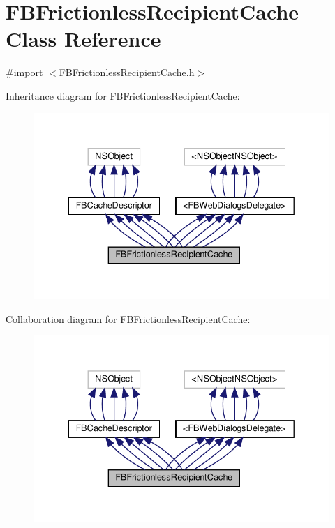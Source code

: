 \hypertarget{interfaceFBFrictionlessRecipientCache}{}\section{F\+B\+Frictionless\+Recipient\+Cache Class Reference}
\label{interfaceFBFrictionlessRecipientCache}


{\ttfamily \#import $<$F\+B\+Frictionless\+Recipient\+Cache.\+h$>$}



Inheritance diagram for F\+B\+Frictionless\+Recipient\+Cache\+:
\nopagebreak
\begin{figure}[H]
\begin{center}
\leavevmode
\includegraphics[width=336pt]{interfaceFBFrictionlessRecipientCache__inherit__graph}
\end{center}
\end{figure}


Collaboration diagram for F\+B\+Frictionless\+Recipient\+Cache\+:
\nopagebreak
\begin{figure}[H]
\begin{center}
\leavevmode
\includegraphics[width=336pt]{interfaceFBFrictionlessRecipientCache__coll__graph}
\end{center}
\end{figure}
